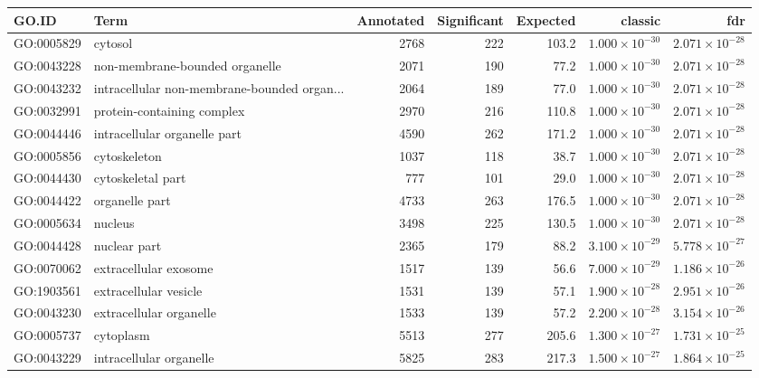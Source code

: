\begin{table}[ht]
\centering
\begin{adjustbox}{max width=\textwidth}
\begin{tabular}{llrrrrr}
  \hline
GO.ID & Term & Annotated & Significant & Expected & classic & fdr \\ 
  \hline
GO:0005829 & cytosol & 2768 & 222 & 103.2 & $1.000 \times 10^{-30}$ & $2.071 \times 10^{-28}$ \\ 
  GO:0043228 & non-membrane-bounded organelle & 2071 & 190 & 77.2 & $1.000 \times 10^{-30}$ & $2.071 \times 10^{-28}$ \\ 
  GO:0043232 & intracellular non-membrane-bounded organ... & 2064 & 189 & 77.0 & $1.000 \times 10^{-30}$ & $2.071 \times 10^{-28}$ \\ 
  GO:0032991 & protein-containing complex & 2970 & 216 & 110.8 & $1.000 \times 10^{-30}$ & $2.071 \times 10^{-28}$ \\ 
  GO:0044446 & intracellular organelle part & 4590 & 262 & 171.2 & $1.000 \times 10^{-30}$ & $2.071 \times 10^{-28}$ \\ 
  GO:0005856 & cytoskeleton & 1037 & 118 & 38.7 & $1.000 \times 10^{-30}$ & $2.071 \times 10^{-28}$ \\ 
  GO:0044430 & cytoskeletal part & 777 & 101 & 29.0 & $1.000 \times 10^{-30}$ & $2.071 \times 10^{-28}$ \\ 
  GO:0044422 & organelle part & 4733 & 263 & 176.5 & $1.000 \times 10^{-30}$ & $2.071 \times 10^{-28}$ \\ 
  GO:0005634 & nucleus & 3498 & 225 & 130.5 & $1.000 \times 10^{-30}$ & $2.071 \times 10^{-28}$ \\ 
  GO:0044428 & nuclear part & 2365 & 179 & 88.2 & $3.100 \times 10^{-29}$ & $5.778 \times 10^{-27}$ \\ 
  GO:0070062 & extracellular exosome & 1517 & 139 & 56.6 & $7.000 \times 10^{-29}$ & $1.186 \times 10^{-26}$ \\ 
  GO:1903561 & extracellular vesicle & 1531 & 139 & 57.1 & $1.900 \times 10^{-28}$ & $2.951 \times 10^{-26}$ \\ 
  GO:0043230 & extracellular organelle & 1533 & 139 & 57.2 & $2.200 \times 10^{-28}$ & $3.154 \times 10^{-26}$ \\ 
  GO:0005737 & cytoplasm & 5513 & 277 & 205.6 & $1.300 \times 10^{-27}$ & $1.731 \times 10^{-25}$ \\ 
  GO:0043229 & intracellular organelle & 5825 & 283 & 217.3 & $1.500 \times 10^{-27}$ & $1.864 \times 10^{-25}$ \\ 

\end{tabular}
\end{adjustbox}
\end{table}
